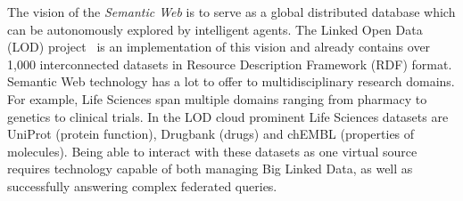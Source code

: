 
The vision of the \emph{Semantic Web} is to serve as a global distributed database which can be autonomously explored by intelligent agents. The Linked Open Data (LOD) project~\cite{bizer2007interlinking} is an implementation of this vision and already contains over 1,000 interconnected datasets in Resource Description Framework (RDF) format. 
Semantic Web technology has a lot to offer to multidisciplinary research domains.
For example, Life Sciences span multiple domains ranging from pharmacy to genetics to clinical trials. In the LOD cloud prominent Life Sciences datasets are 
UniProt (protein function), Drugbank (drugs) and chEMBL (properties of molecules).
Being able to interact with these datasets as one virtual source requires technology capable of both managing Big Linked Data, as well as successfully answering complex federated queries.

